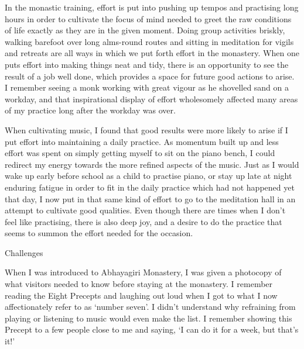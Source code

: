 In the monastic training, effort is put into pushing up tempos and
practising long hours in order to cultivate the focus of mind needed to
greet the raw conditions of life exactly as they are in the given
moment. Doing group activities briskly, walking barefoot over long
alms-round routes and sitting in meditation for vigils and retreats are
all ways in which we put forth effort in the monastery. When one puts
effort into making things neat and tidy, there is an opportunity to see
the result of a job well done, which provides a space for future good
actions to arise. I remember seeing a monk working with great vigour as
he shovelled sand on a workday, and that inspirational display of effort
wholesomely affected many areas of my practice long after the workday
was over.

When cultivating music, I found that good results were more likely to
arise if I put effort into maintaining a daily practice. As momentum
built up and less effort was spent on simply getting myself to sit on
the piano bench, I could redirect my energy towards the more refined
aspects of the music. Just as I would wake up early before school as a
child to practise piano, or stay up late at night enduring fatigue in
order to fit in the daily practice which had not happened yet that day,
I now put in that same kind of effort to go to the meditation hall in an
attempt to cultivate good qualities. Even though there are times when I
don't feel like practising, there is also deep joy, and a desire to do
the practice that seems to summon the effort needed for the occasion.

Challenges

When I was introduced to Abhayagiri Monastery, I was given a photocopy
of what visitors needed to know before staying at the monastery. I
remember reading the Eight Precepts and laughing out loud when I got to
what I now affectionately refer to as `number seven'. I didn't
understand why refraining from playing or listening to music would even
make the list. I remember showing this Precept to a few people close to
me and saying, `I can do it for a week, but that's it!'

